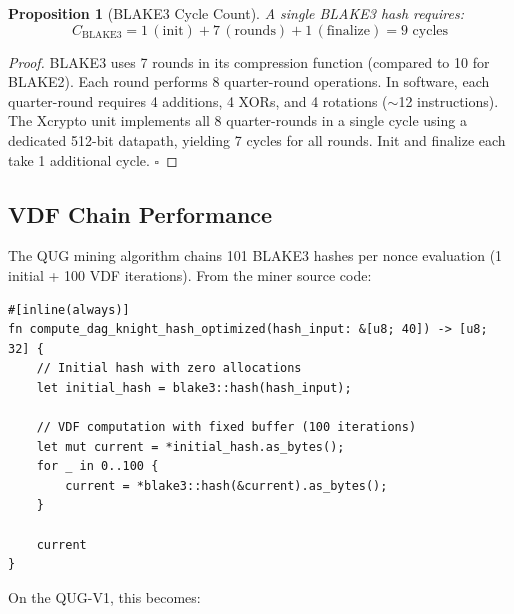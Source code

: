 \documentclass[11pt,a4paper]{article}
\newtheorem{proposition}[theorem]{Proposition}
\begin{document}
\begin{proposition}[BLAKE3 Cycle Count]
A single BLAKE3 hash requires:
\begin{equation}
    C_{\text{BLAKE3}} = 1\,(\text{init}) + 7\,(\text{rounds}) + 1\,(\text{finalize}) = 9 \text{ cycles}
\end{equation}
\end{proposition}

\begin{proof}
BLAKE3 uses 7 rounds in its compression function (compared to 10 for BLAKE2). Each round performs 8 quarter-round operations. In software, each quarter-round requires 4 additions, 4 XORs, and 4 rotations ($\sim$12 instructions). The Xcrypto unit implements all 8 quarter-rounds in a single cycle using a dedicated 512-bit datapath, yielding 7 cycles for all rounds. Init and finalize each take 1 additional cycle. $\square$
\end{proof}

\subsection{VDF Chain Performance}

The QUG mining algorithm chains 101 BLAKE3 hashes per nonce evaluation (1 initial + 100 VDF iterations). From the miner source code:

\begin{lstlisting}[style=rust,caption={QUG Mining Hot Loop (from \texttt{crates/q-miner/src/main.rs})}]
#[inline(always)]
fn compute_dag_knight_hash_optimized(hash_input: &[u8; 40]) -> [u8; 32] {
    // Initial hash with zero allocations
    let initial_hash = blake3::hash(hash_input);

    // VDF computation with fixed buffer (100 iterations)
    let mut current = *initial_hash.as_bytes();
    for _ in 0..100 {
        current = *blake3::hash(&current).as_bytes();
    }

    current
}
\end{lstlisting}

On the QUG-V1, this becomes:
\end{document}
